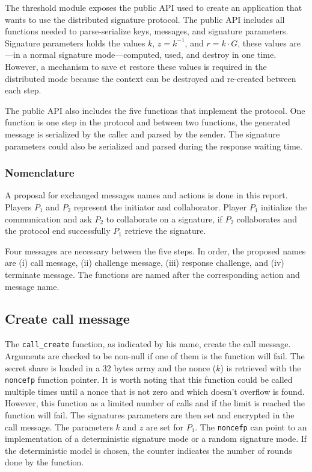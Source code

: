 The threshold module exposes the public API used to create an application that
wants to use the distributed signature protocol. The public API includes all
functions needed to parse-serialize keys, messages, and signature parameters.
Signature parameters holds the values $k$, $z = k^{-1}$, and $r = k \cdot G$,
these values are---in a normal signature mode---computed, used, and destroy in
one time. However, a mechanism to save et restore these values is required in
the distributed mode because the context can be destroyed and re-created between
each step.

The public API also includes the five functions that implement the protocol. One
function is one step in the protocol and between two functions, the generated
message is serialized by the caller and parsed by the sender. The signature
parameters could also be serialized and parsed during the response waiting time.

\subsubsection{Nomenclature}

A proposal for exchanged messages names and actions is done in this report.
Players $P_1$ and $P_2$ represent the initiator and collaborator. Player $P_1$
initialize the communication and ask $P_2$ to collaborate on a signature, if
$P_2$ collaborates and the protocol end successfully $P_1$ retrieve the
signature.

Four messages are necessary between the five steps. In order, the proposed names
are (i) call message, (ii) challenge message, (iii) response challenge, and (iv)
terminate message. The functions are named after the corresponding action and
message name.

\subsection{Create call message}

The \texttt{call\_create} function, as indicated by his name, create the call
message. Arguments are checked to be non-null if one of them is the function
will fail. The secret share is loaded in a 32 bytes array and the nonce ($k$) is
retrieved with the \texttt{noncefp} function pointer. It is worth noting that
this function could be called multiple times until a nonce that is not zero and
which doesn't overflow is found. However, this function as a limited number of
calls and if the limit is reached the function will fail. The signatures
parameters are then set and encrypted in the call message. The parameters $k$
and $z$ are set for $P_1$. The \texttt{noncefp} can point to an implementation
of a deterministic signature mode or a random \cite{rfc6979} signature mode. If
the deterministic model is chosen, the counter indicates the number of rounds
done by the function.

